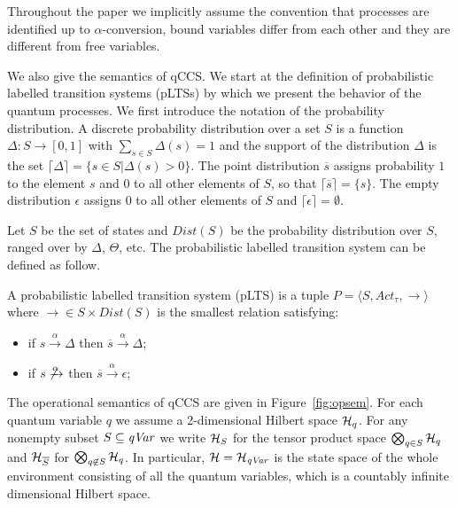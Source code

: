 \documentclass[runningheads]{llncs}
\newcommand{\qVar}{{\it qVar}}
\newcommand{\CH}{{\cal H}}
\begin{document}
Throughout the paper we implicitly assume the convention that processes are identified up to $\alpha$-conversion, bound variables differ from each other and they are different from free variables.

We also give the semantics of qCCS. We start at the definition of probabilistic labelled transition systems (pLTSs) by which we present the behavior of the quantum processes. We first introduce the notation of the probability distribution. A discrete probability distribution over a set $S$ is a function $\Delta: S\rightarrow [0,1]$ with $\sum_{s\in S} \Delta(s) = 1$ and the support of the distribution $\Delta$ is the set $\lceil\Delta\rceil = \{s\in S|\Delta(s)>0\}$. The point distribution $\overline{s}$ assigns probability $1$ to the element $s$ and $0$ to all other elements of $S$, so that $\lceil\overline{s}\rceil = \{s\}$. The empty distribution $\epsilon$ assigns $0$ to all other elements of $S$ and $\lceil\epsilon\rceil = \emptyset$.

Let $S$ be the set of states and $Dist(S)$ be the probability distribution over $S$, ranged over by $\Delta$, $\Theta$, etc. The probabilistic labelled transition system can be defined as follow.

\begin{definition}\label{def:pLTS}
A probabilistic labelled transition system (pLTS) is a tuple $P=\langle S,Act_{\tau},\xrightarrow{}\rangle$ where $\xrightarrow{}\in S\times Dist(S)$ is the smallest relation satisfying:
\begin{itemize}
    \item if $s\xrightarrow{\alpha}\Delta$ then $\overline{s}\xrightarrow{\alpha}\Delta$;
    \item if $s\not\xrightarrow{\alpha}$ then $\overline{s}\xrightarrow{\alpha}\epsilon$;
\end{itemize}
\end{definition}

The operational semantics of qCCS are given in Figure~\ref{fig:opsem}. For each quantum variable $q$ we assume a 2-dimensional Hilbert space $\CH_q$. For any nonempty subset $S\subseteq \qVar$ we write $\CH_S$ for the tensor product space $\bigotimes_{q\in S}\CH_q$ and $\CH_{\overline{S}}$ for $\bigotimes_{q\not\in S}\CH_q$. In particular, $\CH=\CH_{\qVar}$ is the state space of the whole environment consisting of all the quantum variables, which is a countably infinite dimensional Hilbert space.
\end{document}
